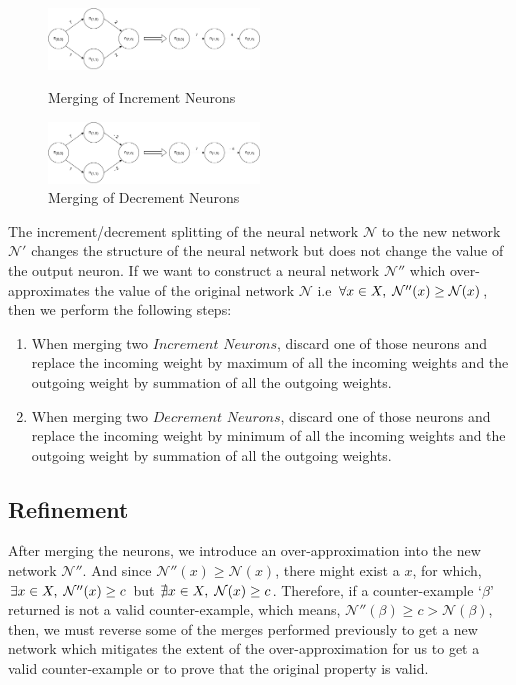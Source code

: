 \begin{figure}[H]
    \centering
    \includegraphics[width=0.5\textwidth]{diagrams/Abstraction_part1.pdf}
    \caption{Merging of Increment Neurons}
    \label{Figure: Merge1}
    \includegraphics[width=0.5\textwidth]{diagrams/Abstraction_part2.pdf}
    \caption{Merging of Decrement Neurons}
    \label{Figure: Merge2}

\end{figure} 
The increment/decrement splitting of the neural network $\mathcal{N}$ to 
the new network $\mathcal{N'}$ changes the structure of the neural network but
 does not change the value of the output neuron. If we want to construct
  a neural network $\mathcal{N}''$ which over-approximates the value of 
  the original network $\mathcal{N}$ i.e $\forall x \in X, \hspace{1mm} 
  \mathcal{N''}(x) \geq \mathcal{N}(x)$, then we perform the following steps:
\begin{enumerate}
    \item When merging two $\textit{Increment Neurons}$, discard one of those neurons and replace the incoming weight by maximum of all the incoming weights and the outgoing weight by summation of all the outgoing weights. 
    \item When merging two $\textit{Decrement Neurons}$, discard one of those neurons and replace the incoming weight by minimum of all the incoming weights and the outgoing weight by summation of all the outgoing weights. 
\end{enumerate}


\subsection{Refinement }
After merging the neurons, we introduce an over-approximation into 
the new network $\mathcal{N''}$. And since $\mathcal{N''}(x) \geq \mathcal{N}(x)$,
 there might exist a $x$, for which, $\exists x \in X, \hspace{1mm} \mathcal{N''}(x)
\geq c$ but $\nexists x \in X, \hspace{1mm} \mathcal{N}(x) \geq c$. 
Therefore, if a counter-example `$\beta$' returned is not a valid counter-example,
which means, $\mathcal{N''}(\beta) \geq c > \mathcal{N}(\beta)$, then, we must 
reverse some of the merges performed previously to get a new network which mitigates
the extent of the over-approximation for us to get a valid counter-example or to 
prove that the original property is valid.

